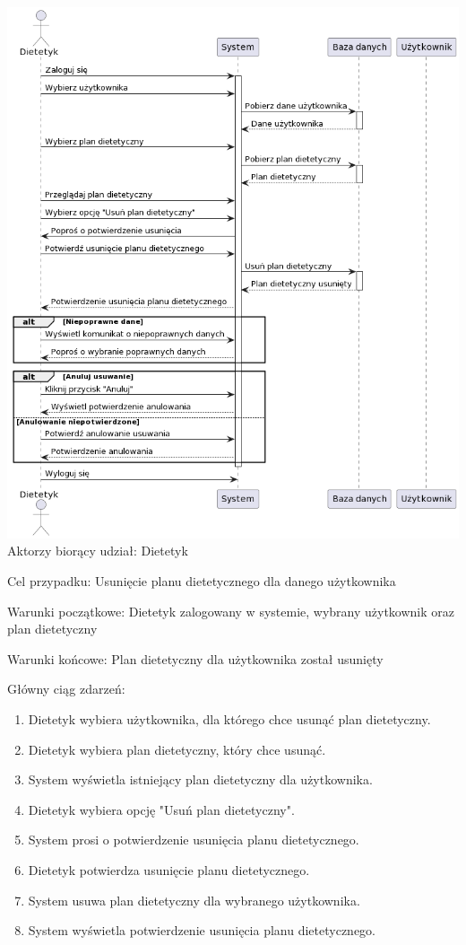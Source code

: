 \documentclass[
]{article}
\providecommand{\tightlist}{%
  \setlength{\itemsep}{0pt}\setlength{\parskip}{0pt}}
\begin{document}
{\includegraphics{diagrams/sequence/dietetyk_usun_plan.png}}
{Aktorzy biorący udział: Dietetyk}

{Cel przypadku: Usunięcie planu dietetycznego dla danego użytkownika}

{Warunki początkowe: Dietetyk zalogowany w systemie, wybrany użytkownik
oraz plan dietetyczny}

{Warunki końcowe: Plan dietetyczny dla użytkownika został usunięty}

{Główny ciąg zdarzeń:}

\begin{enumerate}
\tightlist
\item
  {Dietetyk wybiera użytkownika, dla którego chce usunąć plan
  dietetyczny.}
\item
  {Dietetyk wybiera plan dietetyczny, który chce usunąć.}
\item
  {System wyświetla istniejący plan dietetyczny dla użytkownika.}
\item
  {Dietetyk wybiera opcję "Usuń plan dietetyczny".}
\item
  {System prosi o potwierdzenie usunięcia planu dietetycznego.}
\item
  {Dietetyk potwierdza usunięcie planu dietetycznego.}
\item
  {System usuwa plan dietetyczny dla wybranego użytkownika.}
\item
  {System wyświetla potwierdzenie usunięcia planu dietetycznego.}
\end{enumerate}
\end{document}
